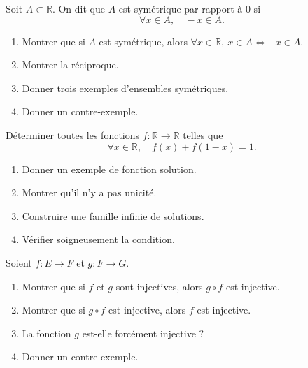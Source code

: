 \documentclass[11pt,a4paper]{article}
\newcommand{\R}{\mathbb{R}}
\newcommand{\ssi}{\Longleftrightarrow}
\begin{document}
\begin{exercicebox}
Soit \(A\subset\R\). On dit que \(A\) est symétrique par rapport à \(0\) si
\[
\forall x\in A,\quad -x\in A.
\]

\begin{enumerate}[label=\alph*)]
    \item Montrer que si \(A\) est symétrique, alors \(\forall x\in\R,\ x\in A\ssi -x\in A\).
    \item Montrer la réciproque.
    \item Donner trois exemples d'ensembles symétriques.
    \item Donner un contre-exemple.
\end{enumerate}
\end{exercicebox}

\begin{exercicebox}
Déterminer toutes les fonctions \(f:\R\to\R\) telles que
\[
\forall x\in\R,\quad f(x)+f(1-x)=1.
\]

\begin{enumerate}[label=\alph*)]
    \item Donner un exemple de fonction solution.
    \item Montrer qu'il n'y a pas unicité.
    \item Construire une famille infinie de solutions.
    \item Vérifier soigneusement la condition.
\end{enumerate}
\end{exercicebox}

\begin{exercicebox}
Soient \(f:E\to F\) et \(g:F\to G\).

\begin{enumerate}[label=\alph*)]
    \item Montrer que si \(f\) et \(g\) sont injectives, alors \(g\circ f\) est injective.
    \item Montrer que si \(g\circ f\) est injective, alors \(f\) est injective.
    \item La fonction \(g\) est-elle forcément injective ?
    \item Donner un contre-exemple.
\end{enumerate}
\end{exercicebox}
\end{document}
